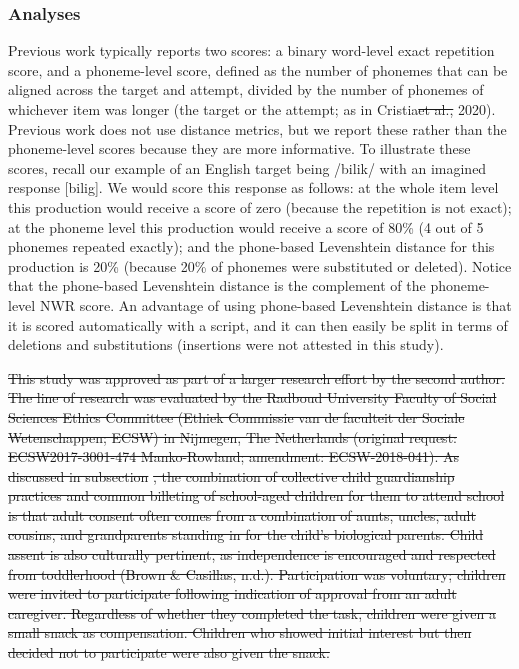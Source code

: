 \documentclass[ %
american, %
,man,floatsintext]{apa6} %
\providecommand{\DIFaddtex}[1]{{\protect\color{blue}\uwave{#1}}} %
\providecommand{\DIFdeltex}[1]{{\protect\color{red}\sout{#1}}}                      %
\providecommand{\DIFaddbegin}{} %
\providecommand{\DIFaddend}{} %
\providecommand{\DIFdelbegin}{} %
\providecommand{\DIFdelend}{} %
\providecommand{\DIFadd}[1]{\texorpdfstring{\DIFaddtex{#1}}{#1}} %
\providecommand{\DIFdel}[1]{\texorpdfstring{\DIFdeltex{#1}}{}} %
\newcommand{\DIFscaledelfig}{0.5}
\newlength{\DIFdelgraphicswidth} %
\newlength{\DIFdelgraphicsheight} %
\newcommand{\DIFaddincludegraphics}[2][]{{\color{blue}\fbox{\DIFOincludegraphics[#1]{#2}}}} %
\newcommand{\DIFdelincludegraphics}[2][]{%
	\sbox{\DIFdelgraphicsbox}{\DIFOincludegraphics[#1]{#2}}%
	\settoboxwidth{\DIFdelgraphicswidth}{\DIFdelgraphicsbox} %
	\settoboxtotalheight{\DIFdelgraphicsheight}{\DIFdelgraphicsbox} %
	\scalebox{\DIFscaledelfig}{%
		\parbox[b]{\DIFdelgraphicswidth}{\usebox{\DIFdelgraphicsbox}\\[-\baselineskip] \rule{\DIFdelgraphicswidth}{0em}}\llap{\resizebox{\DIFdelgraphicswidth}{\DIFdelgraphicsheight}{%
				\setlength{\unitlength}{\DIFdelgraphicswidth}%
				\begin{picture}(1,1)%
				\thicklines\linethickness{2pt} %
				{\color[rgb]{1,0,0}\put(0,0){\framebox(1,1){}}}%
				{\color[rgb]{1,0,0}\put(0,0){\line( 1,1){1}}}%
				{\color[rgb]{1,0,0}\put(0,1){\line(1,-1){1}}}%
				\end{picture}%
			}\hspace*{3pt}}} %
} %
\DeclareRobustCommand{\DIFaddbegin}{\DIFOaddbegin \let\includegraphics\DIFaddincludegraphics} %
\DeclareRobustCommand{\DIFaddend}{\DIFOaddend \let\includegraphics\DIFOincludegraphics} %
\DeclareRobustCommand{\DIFdelbegin}{\DIFOdelbegin \let\includegraphics\DIFdelincludegraphics} %
\DeclareRobustCommand{\DIFdelend}{\DIFOaddend \let\includegraphics\DIFOincludegraphics} %
\begin{document}
\hypertarget{analyses}{%
	\subsubsection{Analyses}\label{analyses}}

Previous work typically reports two scores: a binary word-level exact repetition score, and a phoneme-level score, defined as the number of phonemes that can be aligned across the target and attempt, divided by the number of phonemes of whichever item was longer (the target or the attempt; as in Cristia\DIFdelbegin \DIFdel{et al., }\DIFdelend \DIFaddbegin \DIFadd{, Farabolini, Scaff, Havron, \& Stieglitz, }\DIFaddend 2020). Previous work does not use distance metrics, but we report these rather than the phoneme-level scores because they are more informative. To illustrate these scores, recall our example of an English target being /bilik/ with an imagined response {[}bilig{]}. We would score this response as follows: at the whole item level this production would receive a score of zero (because the repetition is not exact); at the phoneme level this production would receive a score of 80\% (4 out of 5 phonemes repeated exactly); and the phone-based Levenshtein distance for this production is 20\% (because 20\% of phonemes were substituted or deleted). Notice that the phone-based Levenshtein distance is the complement of the phoneme-level NWR score. An advantage of using phone-based Levenshtein distance is that it is scored automatically with a script, and it can then easily be split in terms of deletions and substitutions (insertions were not attested in this study).

\DIFdelbegin %

\DIFdel{This study was approved as part of a larger research effort by the second author. The line of research was evaluated by the Radboud University Faculty of Social Sciences Ethics Committee (Ethiek Commissie van de faculteit der Sociale Wetenschappen; ECSW) in Nijmegen, The Netherlands (original request: ECSW2017-3001-474 Manko-Rowland; amendment: ECSW-2018-041). As discussed in subsection }%
\DIFdel{, the combination of collective child guardianship practices and common billeting of school-aged children for them to attend school is that adult consent often comes from a combination of aunts, uncles, adult cousins, and grandparents standing in for the child's biological parents. Child assent is also culturally pertinent, as independence is encouraged and respected from toddlerhood (Brown \& Casillas, n.d.). Participation was voluntary; children were invited to participate following indication of approval from an adult caregiver. Regardless of whether they completed the task, children were given a small snack as compensation. Children who showed initial interest but then decided not to participate were also given the snack.
}%
\end{document}
